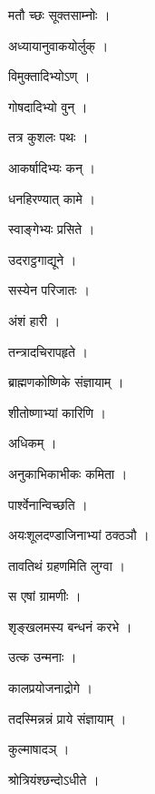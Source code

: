 \documentclass[10pt, openany]{book}
\begin{document}
\noindent मतौ च्छः सूक्तसाम्नोः ।

\noindent अध्यायानुवाकयोर्लुक् ।

\noindent विमुक्तादिभ्योऽण् ।

\noindent गोषदादिभ्यो वुन् ।

\noindent तत्र कुशलः पथः ।

\noindent आकर्षादिभ्यः कन् ।

\noindent धनहिरण्यात् कामे ।

\noindent स्वाङ्गेभ्यः प्रसिते ।

\noindent उदराट्ठगाद्यूने ।

\noindent सस्येन परिजातः ।

\noindent अंशं हारी ।

\noindent तन्त्रादचिरापहृते ।

\noindent ब्राह्मणकोष्णिके संज्ञायाम् ।

\noindent शीतोष्णाभ्यां कारिणि ।

\noindent अधिकम् ।

\noindent अनुकाभिकाभीकः कमिता ।

\noindent पार्श्वेनान्विच्छति ।

\noindent अयःशूलदण्डाजिनाभ्यां ठक्ठञौ ।

\noindent तावतिथं ग्रहणमिति लुग्वा ।

\noindent स एषां ग्रामणीः ।

\noindent श‍ृङ्खलमस्य बन्धनं करभे ।

\noindent उत्क उन्मनाः ।

\noindent कालप्रयोजनाद्रोगे ।

\noindent तदस्मिन्नन्नं प्राये संज्ञायाम् ।

\noindent कुल्माषादञ् ।

\noindent श्रोत्रियंश्छन्दोऽधीते ।
\end{document}
